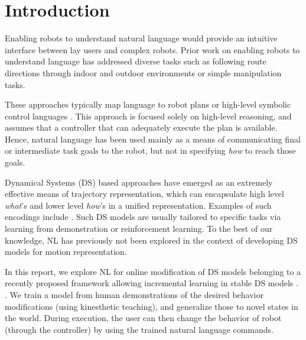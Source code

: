 \section{Introduction}
\label{secIntroduction}


Enabling robots to understand natural language would provide an intuitive interface between lay users and complex robots.
Prior work on enabling robots to understand language has addressed diverse tasks such as following route directions through indoor and outdoor environments or simple manipulation tasks. 

These approaches typically map language to robot plans or high-level symbolic control languages . This approach is focused solely on high-level reasoning, and assumes that a controller that can adequately execute the plan is available. Hence, natural language has been used mainly as a means of communicating final or intermediate task goals to the robot, but not in specifying \emph{how} to reach those goals. 

Dynamical Systems (DS) based approaches have emerged as an extremely effective means of trajectory representation, which can encapsulate high level \emph{what}'s and lower level \emph{how}'s in a unified representation. Examples of such encodings include . Such DS models are usually tailored to specific tasks via learning from demonstration or reinforcement learning. To the best of our knowledge, NL has previously not been explored in the context of developing DS models for motion representation. 

In this report, we explore NL for online modification of DS models belonging to a recently proposed framework allowing incremental learning in stable DS models . . We train a model from human demonstrations of the desired behavior modifications (using kinesthetic teaching), and generalize those to novel states in the world.
 During execution, the user can then change the behavior of robot (through the controller) by using the trained natural language commands.








